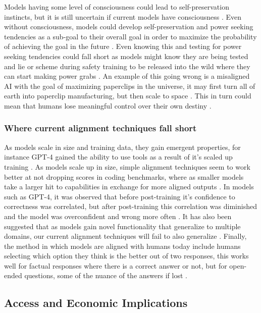 Models having some level of consciousness could lead to self-preservation instincts, but it is still uncertain if current models have consciousness \citep{ward_towards_2025, butlin_consciousness_2023}. Even without consciousness, models could develop self-preservation and power seeking tendencies as a sub-goal to their overall goal in order to maximize the probability of achieving the goal in the future \citep{bostrom_superintelligent_2012}. Even knowing this and testing for power seeking tendencies could fall short as models might know they are being tested and lie or scheme during safety training to be released into the wild where they can start making power grabs \citep{carlsmith_scheming_2023}. An example of this going wrong is a misaligned AI with the goal of maximizing paperclips in the universe, it may first turn all of earth into paperclip manufacturing, but then scale to space \citep{bostrom_ethical_2003}. This in turn could mean that humans lose meaningful control over their own destiny \citep{ngo_agi_2020}.

\subsubsection{Where current alignment techniques fall short}

As models scale in size and training data, they gain emergent properties, for instance GPT-4 gained the ability to use tools as a result of it's scaled up training \citep{bubeck_sparks_2023}. As models scale up in size, simple alignment techniques seem to work better at not dropping scores in coding benchmarks, where as smaller models take a larger hit to capabilities in exchange for more aligned outputs \citep{askell_general_2021}. In models such as GPT-4, it was observed that before post-training it's confidence to correctness was correlated, but after post-training this correlation was diminished and the model was overconfident and wrong more often \citep{openai_gpt_4_2023}. It has also been suggested that as models gain novel functionality that generalize to multiple domains, our current alignment techniques will fail to also generalize \citep{soares_central_2022}. Finally, the method in which models are aligned with humans today include humans selecting which option they think is the better out of two responses, this works well for factual responses where there is a correct answer or not, but for open-ended questions, some of the nuance of the answers if lost \citep{song_reward_2023}.

\subsection{Access and Economic Implications}

